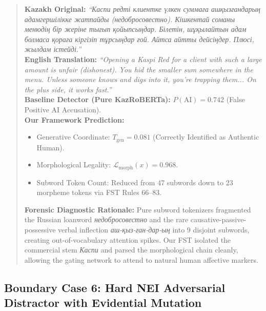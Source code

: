 \begin{quote}
\textbf{Kazakh Original:} \textit{``Каспи редті клиентке үлкен суммаға ашқызғандарың адамгершілікке жатпайды (недобросовестно). Кішкентай соманы менюдің бір жеріне тығып қойыпсыңдар. Білетін, шұқылайтын адам болмаса қораға кіргізіп тұрсыңдар ғой. Айтса айтты дейсіңдер. Плюсі, жылдам істейді.''} \\
\textbf{English Translation:} \textit{``Opening a Kaspi Red for a client with such a large amount is unfair (dishonest). You hid the smaller sum somewhere in the menu. Unless someone knows and digs into it, you're trapping them... On the plus side, it works fast.''} \\
\textbf{Baseline Detector (Pure KazRoBERTa):} $P(\text{AI}) = 0.742$ (False Positive AI Accusation). \\
\textbf{Our Framework Prediction:}
\begin{itemize}
    \item Generative Coordinate: $T_{\text{gen}} = 0.081$ (Correctly Identified as Authentic Human).
    \item Morphological Legality: $\mathcal{L}_{\text{morph}}(x) = 0.968$.
    \item Subword Token Count: Reduced from 47 subwords down to 23 morpheme tokens via FST Rules 66--83.
\end{itemize}
\textbf{Forensic Diagnostic Rationale:} Pure subword tokenizers fragmented the Russian loanword \textit{недобросовестно} and the rare causative-passive-possessive verbal inflection \textit{аш-қыз-ған-дар-ың} into 9 disjoint subwords, creating out-of-vocabulary attention spikes. Our FST isolated the commercial stem \textit{Каспи} and parsed the morphological chain cleanly, allowing the gating network to attend to natural human affective markers.
\end{quote}

\subsection{Boundary Case 6: Hard NEI Adversarial Distractor with Evidential Mutation}
\label{sec:app_case_b6}

